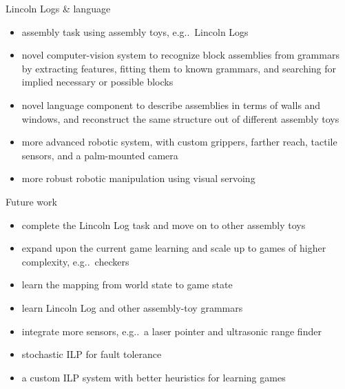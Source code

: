 \documentclass[final,t]{beamer}
\makeatletter
\DeclareRobustCommand\onedot{\futurelet\@let@token\@onedot}
\def\@onedot{\ifx\@let@token.\else.\null\fi\xspace}
\def\eg{{e.g}\onedot} \def\Eg{{E.g}\onedot}
\makeatother
\begin{document}
\begin{frame}{}
\begin{columns}[t]
\begin{column}{.3\linewidth}
      \begin{block}{Lincoln Logs \& language}
	\begin{itemize}
	\item assembly task using assembly toys, \eg\ Lincoln Logs
	\item novel computer-vision system to recognize block
	  assemblies from grammars by extracting features, fitting
	  them to known grammars, and searching for implied necessary
	  or possible blocks
	\item novel language component to describe assemblies in terms
	  of walls and windows, and reconstruct the same structure out
	  of different assembly toys
	\item more advanced robotic system, with custom grippers,
	  farther reach, tactile sensors, and a palm-mounted camera
	\item more robust robotic manipulation using visual servoing
	\end{itemize}
      \end{block}

      \begin{block}{Future work}
	\begin{itemize}
	\item complete the Lincoln Log task and move on to other
	  assembly toys
	\item expand upon the current game learning and scale
	  up to games of higher complexity, \eg\ checkers
	\item learn the mapping from world state to game state
	\item learn Lincoln Log and other assembly-toy grammars
	\item integrate more sensors, \eg\ a laser pointer and
	  ultrasonic range finder
	\item stochastic ILP for fault tolerance
	\item a custom ILP system with better heuristics for learning
	  games
	\end{itemize}
      \end{block}

    \end{column}
  \end{columns}
\end{frame}
\end{document}
